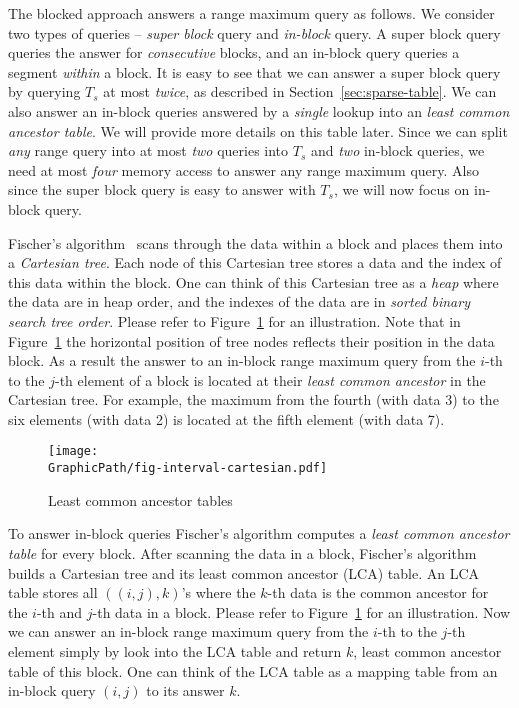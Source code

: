 The blocked approach answers a range maximum query as follows.  We
consider two types of queries -- {\em super block} query and {\em
  in-block} query.  A super block query queries the answer for {\em
  consecutive} blocks, and an in-block query queries a segment {\em
  within} a block.  It is easy to see that we can answer a super block
query by querying $T_s$ at most {\em twice}, as described in
Section~\ref{sec:sparse-table}.  We can also answer an in-block
queries answered by a {\em single} lookup into an {\em least common
  ancestor table}.  We will provide more details on this table later.
Since we can split {\em any} range query into at most {\em two}
queries into $T_s$ and {\em two} in-block queries, we need at most
{\em four} memory access to answer any range maximum query.  Also
since the super block query is easy to answer with $T_s$, we will now
focus on in-block query.

Fischer's algorithm~\cite{Fischer2006TheoreticalAP} scans through the
data within a block and places them into a {\em Cartesian tree}.  Each
node of this Cartesian tree stores a data and the index of this data
within the block.  One can think of this Cartesian tree as a {\em
  heap} where the data are in heap order, and the indexes of the data
are in {\em sorted binary search tree order}.  Please refer to
Figure~\ref{fig:ancesstor-cartesian} for an illustration.  Note that
in Figure~\ref{fig:ancesstor-cartesian} the horizontal position of
tree nodes reflects their position in the data block.  As a result the
answer to an in-block range maximum query from the $i$-th to the
$j$-th element of a block is located at their {\em least common
  ancestor} in the Cartesian tree.  For example, the maximum from the
fourth (with data 3) to the six elements (with data 2) is located at
the fifth element (with data 7).

\begin{figure}[htbp]   
  \centering
  \texttt{[image: \\GraphicPath/fig-interval-cartesian.pdf]}
  \caption{Least common ancestor tables}
  \label{fig:ancesstor-cartesian}
\end{figure}

To answer in-block queries Fischer's algorithm computes a {\em least
common ancestor table} for every block.  After scanning the data in a
block, Fischer's algorithm builds a Cartesian tree and its least common
ancestor (LCA) table.  An LCA table stores all $((i, j), k)$'s where the
$k$-th data is the common ancestor for the $i$-th and $j$-th data in a
block.  Please refer to Figure~\ref{fig:ancesstor-cartesian} for an
illustration.  Now we can answer an in-block range maximum query from
the $i$-th to the $j$-th element simply by look into the LCA table and
return $k$,  least common ancestor table of this block.  One can think
of the LCA table as a mapping table from an in-block query $(i, j)$ to
its answer $k$.


